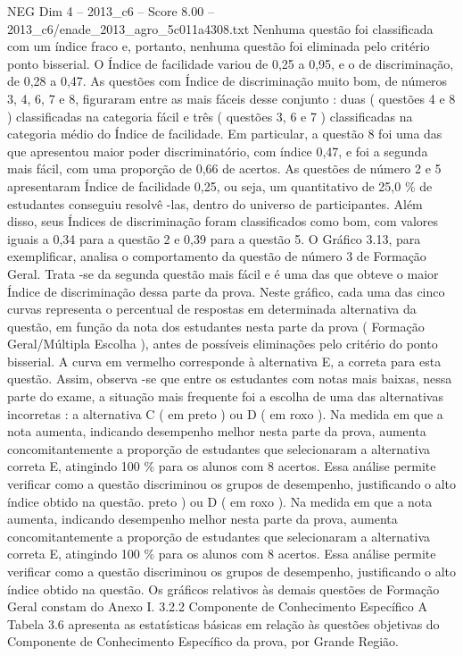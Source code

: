 \begin{textsample}{NEG Dim 4 – 2013\_c6 – Score 8.00 – 2013\_c6/enade\_2013\_agro\_5c011a4308.txt}
Nenhuma questão foi classificada com um índice fraco e, portanto, nenhuma questão foi eliminada pelo critério ponto bisserial.
O Índice de facilidade variou de 0,25 a 0,95, e o de discriminação, de 0,28 a 0,47.
As questões com Índice de discriminação muito bom, de números 3, 4, 6, 7 e 8, figuraram entre as mais fáceis desse conjunto : duas ( questões 4 e 8 ) classificadas na categoria fácil e três ( questões 3, 6 e 7 ) classificadas na categoria médio do Índice de facilidade.
Em particular, a questão 8 foi uma das que apresentou maior poder discriminatório, com índice 0,47, e foi a segunda mais fácil, com uma proporção de 0,66 de acertos.
As questões de número 2 e 5 apresentaram Índice de facilidade 0,25, ou seja, um quantitativo de 25,0 \% de estudantes conseguiu resolvê -las, dentro do universo de participantes.
Além disso, seus Índices de discriminação foram classificados como bom, com valores iguais a 0,34 para a questão 2 e 0,39 para a questão 5.
O Gráfico 3.13, para exemplificar, analisa o comportamento da questão de número 3 de Formação Geral.
Trata -se da segunda questão mais fácil e é uma das que obteve o maior Índice de discriminação dessa parte da prova.
Neste gráfico, cada uma das cinco curvas representa o percentual de respostas em determinada alternativa da questão, em função da nota dos estudantes nesta parte da prova ( Formação Geral/Múltipla Escolha ), antes de possíveis eliminações pelo critério do ponto bisserial.
A curva em vermelho corresponde à alternativa E, a correta para esta questão.
Assim, observa -se que entre os estudantes com notas mais baixas, nessa parte do exame, a situação mais frequente foi a escolha de uma das alternativas incorretas : a alternativa C ( em preto ) ou D ( em roxo ).
Na medida em que a nota aumenta, indicando desempenho melhor nesta parte da prova, aumenta concomitantemente a proporção de estudantes que selecionaram a alternativa correta E, atingindo 100 \% para os alunos com 8 acertos.
Essa análise permite verificar como a questão discriminou os grupos de desempenho, justificando o alto índice obtido na questão. preto ) ou D ( em roxo ).
Na medida em que a nota aumenta, indicando desempenho melhor nesta parte da prova, aumenta concomitantemente a proporção de estudantes que selecionaram a alternativa correta E, atingindo 100 \% para os alunos com 8 acertos.
Essa análise permite verificar como a questão discriminou os grupos de desempenho, justificando o alto índice obtido na questão.
Os gráficos relativos às demais questões de Formação Geral constam do Anexo I. 3.2.2 Componente de Conhecimento Específico A Tabela 3.6 apresenta as estatísticas básicas em relação às questões objetivas do Componente de Conhecimento Específico da prova, por Grande Região.

\end{textsample}
